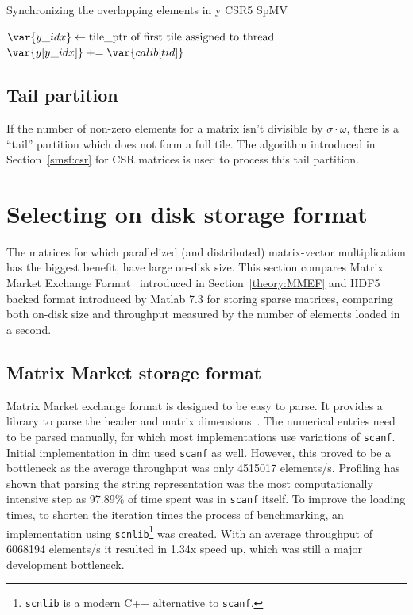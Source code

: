 \documentclass[thesis=M,english]{FITthesis}[2019/12/23]
\newcommand{\pluseq}{\mathrel{+}=}
\begin{document}
\begin{algorithm}
    \caption{Synchronizing the overlapping elements in y CSR5 SpMV}
    \begin{algorithmic}

        \State $\var{y\_idx} \gets \text{tile\_ptr of first tile assigned to thread}$
        \State $\var{y[y\_idx]} \pluseq \var{calib[tid]}$
        \EndFor
        \EndFunction
    \end{algorithmic}
\end{algorithm}

\subsection{Tail partition}

If the number of non-zero elements for a matrix isn't divisible by \(\sigma{} \cdot \omega{}\), there
is a ``tail'' partition which does not form a full tile. The algorithm introduced in Section~\ref{smsf:csr} 
for CSR matrices is used to process this tail partition.

\section{Selecting on disk storage format}\label{impl:matlabComp}

The matrices for which parallelized (and distributed) matrix-vector multiplication has the biggest benefit,
have large on-disk size. This section compares Matrix Market Exchange Format~\cite{mmef} introduced in
Section~\ref{theory:MMEF} and HDF5 backed format
introduced by Matlab 7.3 for storing sparse matrices, comparing both on-disk size and throughput
measured by the number of elements loaded in a second.

\subsection{Matrix Market storage format}

Matrix Market exchange format is designed to be easy to parse. It provides a library to parse
the header and matrix dimensions~\cite{mmC}.
The numerical entries need to be parsed manually, for which most implementations use variations of \texttt{scanf}.
Initial implementation in dim used \texttt{scanf} as well. However, this proved to be a bottleneck as
the average throughput was only \num{4515017} elements/s. Profiling has shown that parsing the string representation
was the most computationally intensive step as 97.89\% of time spent was in \texttt{scanf} itself.
To improve the loading times, to
shorten the iteration times the process of benchmarking, an implementation using
\texttt{scnlib}\footnote{\texttt{scnlib} is a modern C++ alternative to \texttt{scanf}.}
was created. With an average throughput of \num{6068194} elements/s it resulted in 1.34x speed up, which was
still a major development bottleneck.
\end{document}
